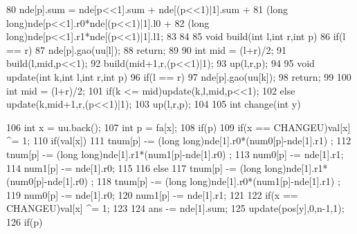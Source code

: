 \documentclass[11pt]{article}
\begin{document}
\begin{Code}
{{{ 80               nde[p].sum = nde[p<<1].sum + nde[(p<<1)|1].sum +
 81                   (long long)nde[p<<1].r0*nde[(p<<1)|1].l0 +
 82                   (long long)nde[p<<1].r1*nde[(p<<1)|1].l1;
 83           }
 84       }
 85       void build(int l,int r,int p){
 86           if(l == r){
 87               nde[p].gao(uu[l]);
 88               return;
 89           }
 90           int mid = (l+r)/2;
 91           build(l,mid,p<<1);
 92           build(mid+1,r,(p<<1)|1);
 93           up(l,r,p);
 94       }
 95       void update(int k,int l,int r,int p){
 96           if(l == r){
 97               nde[p].gao(uu[k]);
 98               return;
 99           }
100           int mid = (l+r)/2;
101           if(k <= mid)update(k,l,mid,p<<1);
102           else update(k,mid+1,r,(p<<1)|1);
103           up(l,r,p);
104       }
105       int change(int y){
106           int x = uu.back();
107           int p = fa[x];
108           if(p){
109               if(x == CHANGEU)val[x] ^= 1;
110               if(val[x]){
111                   tnum[p] -= (long long)nde[1].r0*(num0[p]-nde[1].r1)
                         ;
112                   tnum[p] -= (long long)nde[1].r1*(num1[p]-nde[1].r0)
                         ;
113                   num0[p] -= nde[1].r1;
114                   num1[p] -= nde[1].r0;
115               }
116               else {
117                   tnum[p] -= (long long)nde[1].r1*(num0[p]-nde[1].r0)
                         ;
118                   tnum[p] -= (long long)nde[1].r0*(num1[p]-nde[1].r1)
                         ;
119                   num0[p] -= nde[1].r0;
120                   num1[p] -= nde[1].r1;
121               }
122               if(x == CHANGEU)val[x] ^= 1;
123           }
124           ans -= nde[1].sum;
125           update(pos[y],0,n-1,1);
126           if(p){


}}}
\end{Code}
\end{document}

